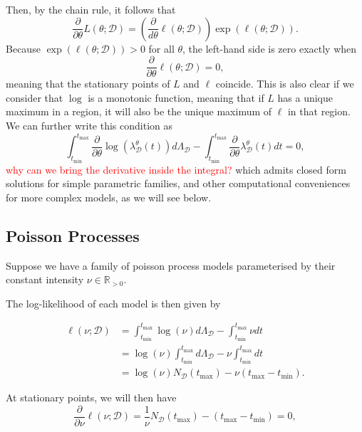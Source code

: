 \documentclass[honours,12pt]{unswthesis}
\numberwithin{equation}{section}
\begin{document}
Then, by the chain rule, it follows that
$$\frac{\partial}{\partial\theta}L(\theta;\mathcal{D}) = \left(\frac{\partial}{d\theta}\ell(\theta;\mathcal{D})\right) \exp\left(\ell(\theta;\mathcal{D})\right).$$
Because $\exp\left(\ell(\theta;\mathcal{D})\right)>0$ for all $\theta$, the left-hand side is zero exactly when
$$\frac{\partial}{\partial\theta}\ell\left(\theta;\mathcal{D}\right)=0,$$
meaning that the stationary points of $L$ and $\ell$ coincide. This is also clear if we consider that $\log$ is a monotonic function, meaning that if $L$ has a unique maximum in a region, it will also be the unique maximum of $\ell$ in that region. We can further write this condition as
$$\int_{t_\mathrm{min}}^{t_\mathrm{max}}\frac{\partial}{\partial\theta}\log(\lambda_\mathcal{D}^\theta(t))d\Lambda_\mathcal{D}-\int_{t_\mathrm{min}}^{t_\mathrm{max}}\frac{\partial}{\partial\theta}\lambda_\mathcal{D}^\theta(t) dt=0,$$
\textcolor{red}{why can we bring the derivative inside the integral?}
which admits closed form solutions for simple parametric families, and other computational conveniences for more complex models, as we will see below.

\subsection{Poisson Processes}
Suppose we have a family of poisson process models parameterised by their constant intensity $\nu\in\mathbb{R}_{>0}$.

The log-likelihood of each model is then given by

\begin{equation}
	\begin{align}
		\ell(\nu;\mathcal{D})
		&= \int_{t_\mathrm{min}}^{t_\mathrm{max}}\log(\nu)d\Lambda_\mathcal{D}-\int_{t_\mathrm{min}}^{t_\mathrm{max}}\nu dt\\
		&= \log(\nu)\int_{t_\mathrm{min}}^{t_\mathrm{max}}d\Lambda_\mathcal{D} - \nu\int_{t_\mathrm{min}}^{t_\mathrm{max}}dt\\
		&= \log(\nu)N_\mathcal{D}\left(t_\mathrm{max}\right) - \nu\left(t_\mathrm{max}-t_\mathrm{min}\right).
	\end{align}
\end{equation}

At stationary points, we will then have
\begin{equation*}
	\frac{\partial}{\partial\nu}\ell(\nu;\mathcal{D}) = \frac{1}{\nu}N_\mathcal{D}\left(t_\mathrm{max}\right)-\left(t_\mathrm{max}-t_\mathrm{min}\right)=0,
\end{equation*}
\end{document}
